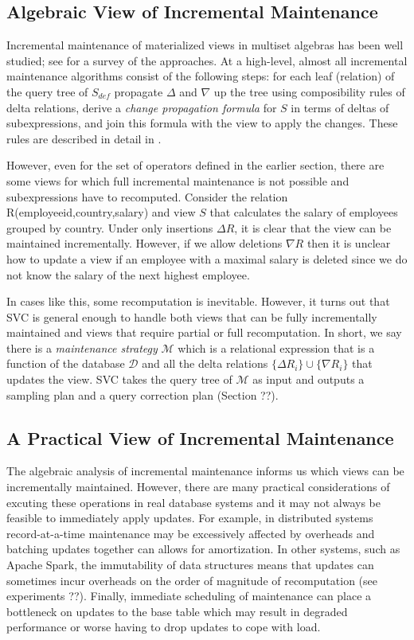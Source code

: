 \subsection{Algebraic View of Incremental Maintenance}\label{subsec-inc}
Incremental maintenance of materialized views in multiset algebras has been well studied; see \cite{chirkova2011materialized} for a survey of the approaches. 
At a high-level, almost all incremental maintenance algorithms consist of the following steps: for each leaf (relation) of the query tree of $S_{def}$ propagate $\Delta$ and $\nabla$ up the tree using composibility rules of delta relations, derive a \emph{change propagation formula} for $S$ in terms of deltas of subexpressions, and join this formula with the view to apply the changes.
These rules are described in detail in \cite{DBLP:journals/vldb/KochAKNNLS14, DBLP:conf/pods/Koch10}.

However, even for the set of operators defined in the earlier section, there are some views for which full incremental maintenance is not possible and subexpressions have to recomputed. Consider the relation R(employeeid,country,salary) and view $S$ that calculates the \maxfunc salary of employees grouped by country. Under only insertions $\Delta R$, it is clear that the view can be maintained incrementally. 
However, if we allow deletions $\nabla R$ then it is unclear how to update a view if an employee with a maximal salary is deleted since we do not know the salary of the next highest employee. 

In cases like this, some recomputation is inevitable.
However, it turns out that SVC is general enough to handle both views that can be fully incrementally maintained and views that require partial or full recomputation.
In short, we say there is a \emph{maintenance strategy} $\mathcal{M}$ which is a relational expression that is a function of the database $\mathcal{D}$ and all the delta relations $\{\Delta R_i\} \cup \{\nabla R_i\}$ that updates the view.
SVC takes the query tree of $\mathcal{M}$ as input and outputs a sampling plan and a query correction plan (Section ??).

\subsection{A Practical View of Incremental Maintenance}
The algebraic analysis of incremental maintenance informs us which views can be incrementally maintained.
However, there are many practical considerations of excuting these operations in real database systems and it may not always be feasible to immediately apply updates.
For example, in distributed systems record-at-a-time maintenance may be excessively affected by overheads and batching updates together can allows for amortization.
In other systems, such as Apache Spark, the immutability of data structures means that updates can sometimes incur overheads on the order of magnitude of recomputation (see experiments ??).
Finally, immediate scheduling of maintenance can place a bottleneck on updates to the base table which may result in degraded performance or worse having to drop updates to cope with load.

